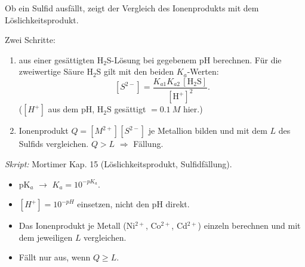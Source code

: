 

Ob ein Sulfid ausfällt, zeigt der Vergleich des Ionenprodukts mit dem
Löslichkeitsprodukt.

\begin{werkzeugkasten}
Zwei Schritte:
\begin{enumerate}
  \item [S$^{2-}$] aus einer gesättigten H$_2$S-Lösung bei gegebenem pH
        berechnen. Für die zweiwertige Säure H$_2$S gilt mit den beiden
        $K_a$-Werten:
        \[
          [S^{2-}] = \frac{K_{a1}K_{a2}\,[\mathrm{H_2S}]}{[\mathrm{H^+}]^2}.
        \]
        ($[H^+]$ aus dem pH, $\mathrm{H_2S}$ gesättigt $=0.1\ M$ hier.)
  \item Ionenprodukt $Q = [M^{2+}][S^{2-}]$ je Metallion bilden und mit dem
        $L$ des Sulfids vergleichen. $Q>L$ $\Rightarrow$ Fällung.
\end{enumerate}
\textit{Skript:} Mortimer Kap. 15 (Löslichkeitsprodukt, Sulfidfällung).
\end{werkzeugkasten}

\begin{achtung}
\begin{itemize}
  \item pK$_a$ $\rightarrow$ $K_a = 10^{-pK_a}$.
  \item $[H^+] = 10^{-pH}$ einsetzen, nicht den pH direkt.
  \item Das Ionenprodukt je Metall (Ni$^{2+}$, Co$^{2+}$, Cd$^{2+}$) einzeln
        berechnen und mit dem jeweiligen $L$ vergleichen.
  \item Fällt nur aus, wenn $Q \geq L$.
\end{itemize}
\end{achtung}
